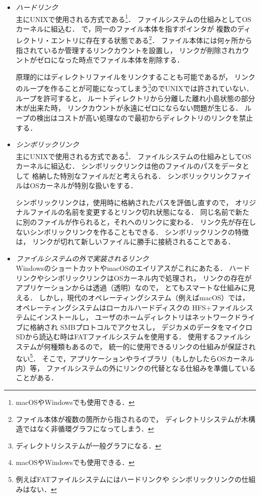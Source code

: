 \begin{itemize}
\item \emph{ハードリンク} \\
  主にUNIXで使用される方式である\footnote{macOSやWindowsでも使用できる．}．
  ファイルシステムの仕組みとしてOSカーネルに組込む．
  で，同一のファイル本体を指すポインタが
  複数のディレクトリ・エントリに存在する状態である\footnote{
    ファイル本体が複数の箇所から指されるので，
    ディレクトリシステムが木構造ではなく非循環グラフになってしまう．}．
  ファイル本体には何ヶ所から指されているか管理するリンクカウントを設置し，
  リンクが削除されカウントがゼロになった時点でファイル本体を削除する．

  原理的にはディレクトリファイルをリンクすることも可能であるが，
  リンクのループを作ることが可能になってしまう\footnote{
    ディレクトリシステムが一般グラフになる．}のでUNIXでは許されていない．
  ループを許可すると，
  ルートディレクトリから分離した離れ小島状態の部分木が出来た時，
  リンクカウントが永遠にゼロにならない問題が生じる．
  ループの検出はコストが高い処理なので最初からディレクトリのリンクを禁止する．

\item \emph{シンボリックリンク} \\
  主にUNIXで使用される方式である\footnote{macOSやWindowsでも使用できる．}．
  ファイルシステムの仕組みとしてOSカーネルに組込む．
  シンボリックリンクは他のファイルのパスをデータとして
  格納した特別なファイルだと考えられる．
  シンボリックリンクファイルはOSカーネルが特別な扱いをする．

  シンボリックリンクは，使用時に格納されたパスを評価し直すので，
  オリジナルファイルの名前を変更するとリンク切れ状態になる．
  同じ名前で新たに別のファイルが作られると，それへのリンクに変わる．
  リンク先が存在しないシンボリックリンクを作ることもできる．
  シンボリックリンクの特徴は，
  リンクが切れて新しいファイルに勝手に接続されることである．

\item \emph{ファイルシステムの外で実装されるリンク} \\
  WindowsのショートカットやmacOSのエイリアスがこれにあたる．
  ハードリンクやシンボリックリンクはOSカーネル内で処理され，
  リンクの存在がアプリケーションからは透過（透明）なので，
  とてもスマートな仕組みに見える．
  しかし，現代のオペレーティングシステム（例えばmacOS）では，
  オペレーティングシステムはローカルハードディスクの
  HFS+ファイルシステムにインストールし，
  ユーザのホームディレクトリはネットワークドライブに格納され
  SMBプロトコルでアクセスし，
  デジカメのデータをマイクロSDから読込む時はFATファイルシステムを使用する．
  使用するファイルシステムが何種類もあるので，
  統一的に使用できるリンクの仕組みが保証されない\footnote{
    例えばFATファイルシステムにはハードリンクや
    シンボリックリンクの仕組みはない．}．
  そこで，アプリケーションやライブラリ（もしかしたらOSカーネル内）等，
  ファイルシステムの外にリンクの代替となる仕組みを準備していることがある．


\end{itemize}

